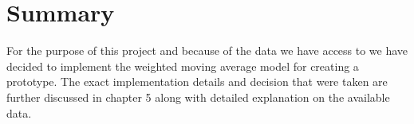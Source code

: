 

\section{Summary}
For the purpose of this project and because of the data we have access to we have decided to implement the weighted moving average model for creating a prototype. The exact implementation details and decision that were taken are further discussed in chapter 5 along with detailed explanation on the available data.